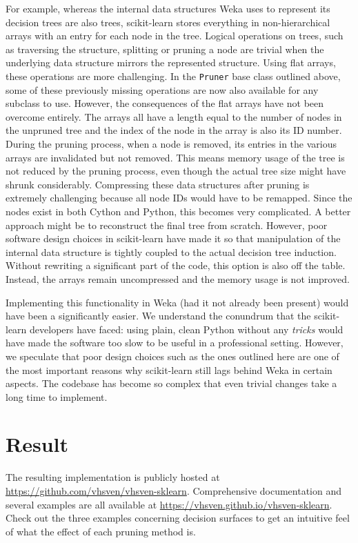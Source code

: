For example, whereas the internal data structures Weka uses to represent its decision trees are also trees, scikit-learn stores everything in non-hierarchical arrays with an entry for each node in the tree. Logical operations on trees, such as traversing the structure, splitting or pruning a node are trivial when the underlying data structure mirrors the represented structure. Using flat arrays, these operations are more challenging. In the \texttt{Pruner} base class outlined above, some of these previously missing operations are now also available for any subclass to use. However, the consequences of the flat arrays have not been overcome entirely. The arrays all have a length equal to the number of nodes in the unpruned tree and the index of the node in the array is also its ID number. During the pruning process, when a node is removed, its entries in the various arrays are invalidated but not removed. This means memory usage of the tree is not reduced by the pruning process, even though the actual tree size might have shrunk considerably. Compressing these data structures after pruning is extremely challenging because all node IDs would have to be remapped. Since the nodes exist in both Cython and Python, this becomes very complicated. A better approach might be to reconstruct the final tree from scratch. However, poor software design choices in scikit-learn have made it so that manipulation of the internal data structure is tightly coupled to the actual decision tree induction. Without rewriting a significant part of the code, this option is also off the table. Instead, the arrays remain uncompressed and the memory usage is not improved.

Implementing this functionality in Weka (had it not already been present) would have been a significantly easier. We understand the conundrum that the scikit-learn developers have faced: using plain, clean Python without any \emph{tricks} would have made the software too slow to be useful in a professional setting. However, we speculate that poor design choices such as the ones outlined here are one of the most important reasons why scikit-learn still lags behind Weka in certain aspects. The codebase has become so complex that even trivial changes take a long time to implement.

\section{Result}
The resulting implementation is publicly hosted at \url{https://github.com/vhsven/vhsven-sklearn}. Comprehensive documentation and several examples are all available at \url{https://vhsven.github.io/vhsven-sklearn}. Check out the three examples concerning decision surfaces to get an intuitive feel of what the effect of each pruning method is.

